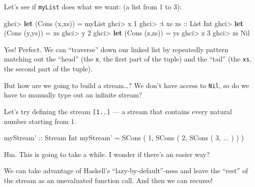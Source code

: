 \documentclass[]{article}
\newenvironment{Shaded}{}{}
\newcommand{\KeywordTok}[1]{\textcolor[rgb]{0.00,0.44,0.13}{\textbf{{#1}}}}
\newcommand{\DataTypeTok}[1]{\textcolor[rgb]{0.56,0.13,0.00}{{#1}}}
\newcommand{\DecValTok}[1]{\textcolor[rgb]{0.25,0.63,0.44}{{#1}}}
\newcommand{\OtherTok}[1]{\textcolor[rgb]{0.00,0.44,0.13}{{#1}}}
\newcommand{\FunctionTok}[1]{\textcolor[rgb]{0.02,0.16,0.49}{{#1}}}
\newcommand{\NormalTok}[1]{{#1}}
\begin{document}
Let's see if \texttt{myList} does what we want: (a list from 1 to 3):

\begin{Shaded}
\begin{Highlighting}[]
\NormalTok{ghci}\FunctionTok{>} \KeywordTok{let} \NormalTok{(}\DataTypeTok{Cons} \NormalTok{(x,xs)) }\FunctionTok{=} \NormalTok{myList}
\NormalTok{ghci}\FunctionTok{>} \NormalTok{x}
\DecValTok{1}
\NormalTok{ghci}\FunctionTok{>} \FunctionTok{:}\NormalTok{t xs}
\OtherTok{xs ::} \DataTypeTok{List} \DataTypeTok{Int}
\NormalTok{ghci}\FunctionTok{>} \KeywordTok{let} \NormalTok{(}\DataTypeTok{Cons} \NormalTok{(y,ys)) }\FunctionTok{=} \NormalTok{xs}
\NormalTok{ghci}\FunctionTok{>} \NormalTok{y}
\DecValTok{2}
\NormalTok{ghci}\FunctionTok{>} \KeywordTok{let} \NormalTok{(}\DataTypeTok{Cons} \NormalTok{(z,zs)) }\FunctionTok{=} \NormalTok{ys}
\NormalTok{ghci}\FunctionTok{>} \NormalTok{z}
\DecValTok{3}
\NormalTok{ghci}\FunctionTok{>} \NormalTok{zs}
\DataTypeTok{Nil}
\end{Highlighting}
\end{Shaded}

Yes! Perfect. We can ``traverse'' down our linked list by repeatedly pattern
matching out the ``head'' (the \texttt{x}, the first part of the tuple) and the
``tail'' (the \texttt{xs}, the second part of the tuple).

But how are we going to build a stream\ldots{}? We don't have access to
\texttt{Nil}, so do we have to manually type out an infinite stream?

Let's try defining the stream \texttt{{[}1..{]}} --- a stream that contains
every natural number starting from 1.

\begin{Shaded}
\begin{Highlighting}[]
\OtherTok{myStream' ::} \DataTypeTok{Stream} \DataTypeTok{Int}
\NormalTok{myStream' }\FunctionTok{=} \DataTypeTok{SCons} \NormalTok{( }\DecValTok{1}\NormalTok{, }\DataTypeTok{SCons} \NormalTok{( }\DecValTok{2}\NormalTok{, }\DataTypeTok{SCons} \NormalTok{( }\DecValTok{3}\NormalTok{, }\FunctionTok{...} \NormalTok{) ) )}
\end{Highlighting}
\end{Shaded}

Hm. This is going to take a while. I wonder if there's an easier way?

We can take advantage of Haskell's ``lazy-by-default''-ness and leave the
``rest'' of the stream as an unevaluated function call. And then we can recurse!
\end{document}
